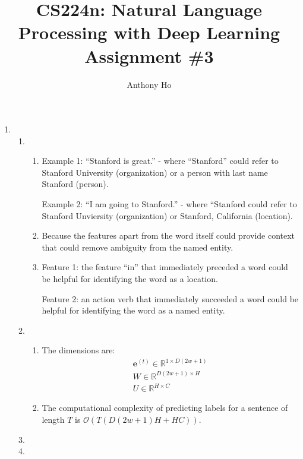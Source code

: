 \documentclass[10pt,reqno]{amsart}
\begin{document}
\title{CS224n: Natural Language Processing with Deep Learning\\Assignment \#3}
\author{Anthony Ho}
\maketitle


\newcommand{\f}{\frac}
\newcommand{\pd}[1]{\frac{\partial}{\partial #1}}
\newcommand{\pdd}[2]{\frac{\partial #1}{\partial #2}}
\newcommand{\softmax}{\text{softmax}}


\renewcommand{\labelenumi}{\arabic{enumi}.}
\begin{enumerate}[topsep=0pt,itemsep=3ex,partopsep=1ex,parsep=1ex]


\item
  \begin{enumerate}[itemsep=2ex]
  \item 
    \begin{enumerate}[itemsep=2ex]
      \item
        Example 1: ``Stanford is great.'' - where ``Stanford'' could refer to 
        Stanford University (organization) or a person with last name Stanford (person).

        Example 2: ``I am going to Stanford.'' - where ``Stanford could refer to 
        Stanford Unviersity (organization) or Stanford, California (location).
      \item Because the features apart from the word itself could provide context 
        that could remove ambiguity from the named entity.
      \item
        Feature 1: the feature ``in'' that immediately preceded a word could be helpful 
        for identifying the word as a location.

        Feature 2: an action verb that immediately succeeded a word could be helpful 
        for identifying the word as a named entity.
    \end{enumerate}
  \item 
    \begin{enumerate}[itemsep=2ex]
      \item The dimensions are:
        \begin{align*}
          \bm{e}^{(t)} \in \mathbb{R}^{1 \times D(2w+1)} \\
          W \in \mathbb{R}^{D(2w+1) \times H} \\
          U \in \mathbb{R}^{H \times C} 
        \end{align*}
      \item The computational complexity of predicting labels for a sentence of length $T$ is
        $\mathcal{O}(T (D(2w+1)H + HC))$.
    \end{enumerate}
  \item %
  \item 
  \end{enumerate}



\end{enumerate}
\end{document}
